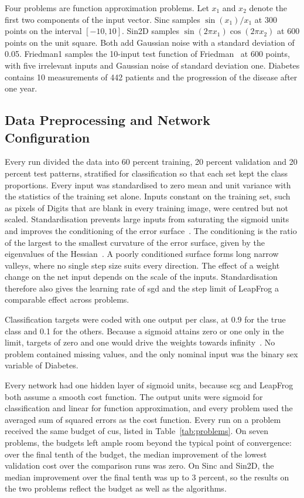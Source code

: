 \documentclass[conference]{IEEEtran}
\begin{document}
Four problems are function approximation problems. Let $x_1$ and $x_2$ denote the
first two components of the input vector. Sinc samples $\sin(x_1)/x_1$ at 300
points on the interval $[-10, 10]$. Sin2D samples $\sin(2\pi x_1)\cos(2\pi x_2)$
at 600 points on the unit square. Both add Gaussian noise with a standard deviation
of 0.05. Friedman1 samples the 10-input test function of Friedman~\cite{friedman1991} at
600 points, with five irrelevant inputs and Gaussian noise of standard deviation
one. Diabetes contains 10 measurements of 442 patients and the
progression of the disease after one year.

\subsection{Data Preprocessing and Network Configuration}

Every run divided the data into 60 percent training, 20 percent validation and 20
percent test patterns, stratified for classification so that each set kept the
class proportions. Every input was standardised to zero mean and
unit variance with the statistics of the training set alone. Inputs constant on
the training set, such as pixels of Digits that are blank in every training image, were centred
but not scaled.
Standardisation prevents large inputs from saturating the sigmoid
units~\cite{engelbrecht2007} and improves the conditioning of the error
surface~\cite{lecun1998}. The conditioning is the ratio of the largest to the
smallest curvature of the error surface, given by the eigenvalues of the
Hessian~\cite{lecun1998}. A
poorly conditioned surface forms long narrow valleys, where no single step size
suits every direction. The effect of a weight
change on the net input depends on the scale of the inputs. Standardisation
therefore also gives the learning rate of \gls{sgd} and the step limit of LeapFrog
a comparable effect across problems.

Classification targets were coded with one output per class, at 0.9 for the true
class and 0.1 for the others. Because a sigmoid attains zero or one only in the limit, targets of zero and
one would drive the weights towards infinity~\cite{engelbrecht2007,lecun1998}. No problem contained missing
values, and the only nominal input was the binary sex variable of Diabetes.

Every network had one hidden layer of sigmoid units, because \gls{scg} and LeapFrog
both assume a smooth cost function. The output units were sigmoid for
classification and linear for function approximation, and every problem used the
averaged sum of squared errors as the cost function. Every run on a problem received
the same budget of \glspl{cu}, listed in Table~\ref{tab:problems}. On seven
problems, the budgets left ample room beyond the typical point of convergence: over
the final tenth of the budget, the median improvement of the lowest validation cost
over the comparison runs was zero. On Sinc and Sin2D, the median improvement over
the final tenth was up to 3 percent, so the results on the two problems reflect the
budget as well as the algorithms.
\end{document}
